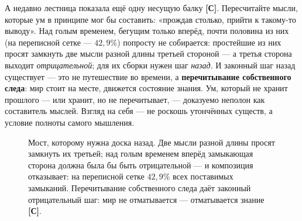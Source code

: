 \documentclass[11pt,letterpaper]{article}
\newcommand{\stC}{\textbf{[С]}\xspace}
\begin{document}
А недавно лестница показала ещё одну несущую балку \stC. Пересчитайте
мысли, которые ум в принципе мог бы составить: «прождав столько,
прийти к такому-то выводу». Над голым временем, бегущим только
вперёд, почти половина из них (на переписной сетке --- $42{,}9\%$)
попросту не собирается: простейшие из них просят замкнуть две мысли
разной длины третьей стороной --- а третья сторона выходит
\emph{отрицательной}; для их сборки нужен шаг \emph{назад}. И
законный шаг назад существует --- это не путешествие во времени, а
\textbf{перечитывание собственного следа}: мир стоит на месте,
движется состояние знания. Ум, который не хранит прошлого --- или
хранит, но не перечитывает, --- доказуемо неполон как составитель
мыслей. Взгляд на себя --- не роскошь утончённых существ, а условие
полноты самого мышления.

\begin{figure}[H]
\centering
{}
\caption{Мост, которому нужна доска назад. Две мысли разной длины
просят замкнуть их третьей; над голым временем вперёд замыкающая
сторона должна была бы быть отрицательной --- и композиция
отказывает: на переписной сетке $42{,}9\%$ всех поставимых
замыканий. Перечитывание собственного следа даёт законный
отрицательный шаг: мир не отматывается --- отматывается знание
\stC.}
\label{fig:reread}
\end{figure}
\end{document}
